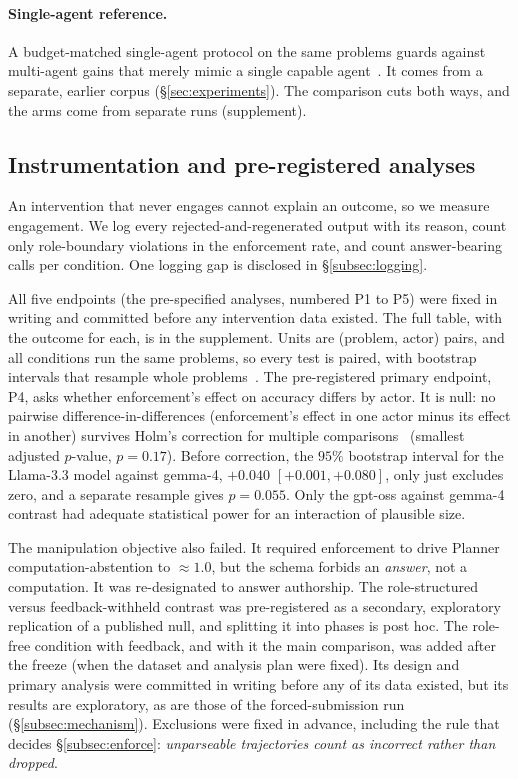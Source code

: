 \paragraph{Single-agent reference.} A budget-matched single-agent protocol
on the same problems guards against multi-agent gains that merely mimic a
single capable agent~\cite{zhang2026rethinking}. It comes from a separate,
earlier corpus (\S\ref{sec:experiments}). The comparison cuts both ways, and
the arms come from separate runs (supplement).

\subsection{Instrumentation and pre-registered analyses}
\label{subsec:prereg}

An intervention that never engages cannot explain an outcome, so we measure
engagement. We log every rejected-and-regenerated output with its reason,
count only role-boundary violations in the enforcement rate, and count
answer-bearing calls per condition. One logging gap is disclosed in
\S\ref{subsec:logging}.

All five endpoints (the pre-specified analyses, numbered P1 to P5) were
fixed in writing and committed before any intervention data existed. The full table, with the
outcome for each, is in the supplement. Units are (problem, actor) pairs,
and all conditions run the same problems, so every test is paired, with
bootstrap intervals that resample whole problems~\cite{efron1979bootstrap}.
The pre-registered primary endpoint, P4, asks whether enforcement's effect
on accuracy differs by actor. It is null: no pairwise
difference-in-differences (enforcement's effect in one actor minus its
effect in another) survives Holm's correction for multiple
comparisons~\cite{holm1979simple} (smallest adjusted $p$-value, $p=0.17$).
Before correction, the $95\%$ bootstrap interval for the Llama-3.3 model
against gemma-4, $+0.040$ $[+0.001,+0.080]$, only just excludes zero, and a
separate resample gives $p=0.055$. Only the gpt-oss against gemma-4 contrast had adequate
statistical power for an interaction of plausible size.

The \Pone{} manipulation objective also failed. It required enforcement to
drive Planner computation-abstention to ${\approx}1.0$, but the schema
forbids an \emph{answer}, not a computation. It was re-designated to answer
authorship. The role-structured versus feedback-withheld contrast was
pre-registered as a secondary, exploratory replication of a published null,
and splitting it into phases is post hoc. The role-free condition with
feedback, and with it the main comparison, was added after the freeze (when
the dataset and analysis plan were fixed). Its design and primary analysis
were committed in writing before any of its data existed, but its results
are exploratory, as are those of the forced-submission run
(\S\ref{subsec:mechanism}).
Exclusions were fixed in advance, including the rule that decides
\S\ref{subsec:enforce}: \emph{unparseable trajectories count as incorrect
rather than dropped}.
